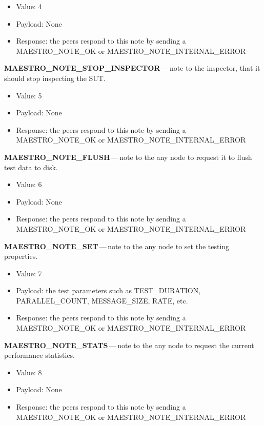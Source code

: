 \begin{description}
  \begin{itemize}
    \setlength\itemsep{0em}
    \item Value: 4
    \item Payload: None
    \item Response: the peers respond to this note by sending a MAESTRO\_NOTE\_OK or MAESTRO\_NOTE\_INTERNAL\_ERROR
  \end{itemize}
  \item \textbf{MAESTRO\_NOTE\_STOP\_INSPECTOR}\,---\,note to the inspector, that it should stop inspecting the SUT.
  \begin{itemize}
    \setlength\itemsep{0em}
    \item Value: 5
    \item Payload: None
    \item Response: the peers respond to this note by sending a MAESTRO\_NOTE\_OK or MAESTRO\_NOTE\_INTERNAL\_ERROR
  \end{itemize}
  \item \textbf{MAESTRO\_NOTE\_FLUSH}\,---\,note to the any node to request it to flush test data to disk.
  \begin{itemize}
    \setlength\itemsep{0em}
    \item Value: 6
    \item Payload: None
    \item Response: the peers respond to this note by sending a MAESTRO\_NOTE\_OK or MAESTRO\_NOTE\_INTERNAL\_ERROR
  \end{itemize}
  \item \textbf{MAESTRO\_NOTE\_SET}\,---\,note to the any node to set the testing properties.
  \begin{itemize}
    \setlength\itemsep{0em}
    \item Value: 7
    \item Payload: the test parameters such as TEST\_DURATION, PARALLEL\_COUNT, MESSAGE\_SIZE, RATE, etc.
    \item Response: the peers respond to this note by sending a MAESTRO\_NOTE\_OK or MAESTRO\_NOTE\_INTERNAL\_ERROR
  \end{itemize}
  \item \textbf{MAESTRO\_NOTE\_STATS}\,---\,note to the any node to request the current performance statistics.
  \begin{itemize}
    \setlength\itemsep{0em}
    \item Value: 8
    \item Payload: None
    \item Response: the peers respond to this note by sending a MAESTRO\_NOTE\_OK or MAESTRO\_NOTE\_INTERNAL\_ERROR

\end{itemize}
\end{description}
